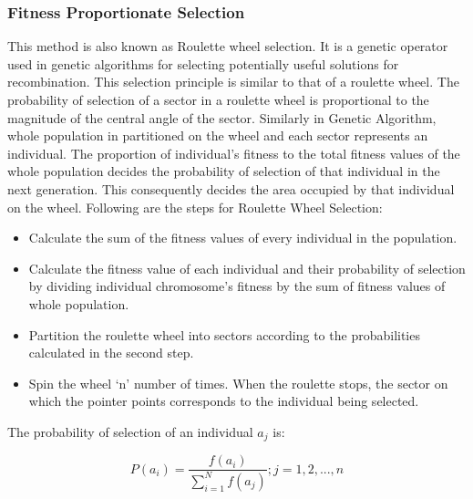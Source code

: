 \documentclass[a4paper, 12pt]{article}
\begin{document}
\subsubsection{Fitness Proportionate Selection}
This method is also known as Roulette wheel selection. It is a genetic operator used in genetic algorithms for selecting potentially useful 
solutions for recombination. This selection principle is similar to that of a roulette wheel. The probability of selection of a sector in a 
roulette wheel is proportional to the magnitude of the central angle of the sector. Similarly in Genetic Algorithm, whole population in
partitioned on the wheel and each sector represents an individual. The proportion of individual’s fitness to the total fitness values of the 
 whole population decides the probability of selection of that individual in the next generation. This consequently decides the area occupied 
by that individual on the wheel. Following are the steps for Roulette Wheel Selection:
\begin{itemize}
\item Calculate the sum of the fitness values of every individual in the population.
\item Calculate the fitness value of each individual and their probability of selection by dividing individual chromosome’s fitness by the sum 
of fitness values of whole population.
\item Partition the roulette wheel into sectors according to the probabilities calculated in the second step.
\item Spin the wheel ‘n’ number of times. When the roulette stops, the sector on which the pointer points corresponds to the individual being 
selected.
\end{itemize}
The probability of selection of an individual $a_j$ is:
\begin{large}
\boldmath\begin{equation*}
P\left(a_{i}\right) = \frac{f\left(a_{i}\right)}{\sum_{i=1}^{N}f\left(a_j\right)}; j=1,2,...,n 
\end{equation*}
\end{large}
\end{document}
